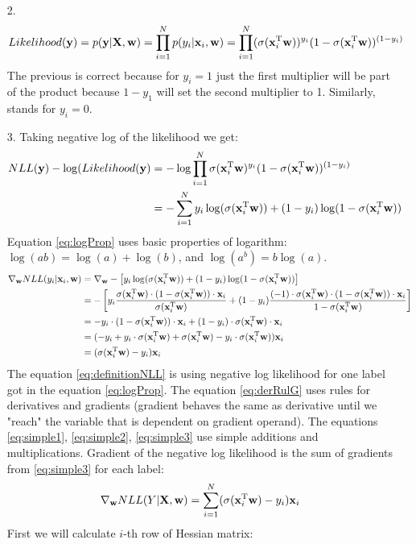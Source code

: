 \documentclass[10pt,a4paper]{article}
\begin{document}
\begin{enumerate}
\begin{enumerate}
\item[2.]
\begin{align*}
	Likelihood(\vect{y}) = p(\vect{y} | \mat{X}, \vect{w}) = \prod_{i=1}^Np(y_i|\vect{x}_i, \vect{w}) = 
	\prod_{i=1}^N (\logfun)^{y_i}(
	1 - \logfun)^{(1-y_i)}
\end{align*}
The previous is correct because for $y_i = 1$ just the first multiplier will be part of the product because $1-y_1$ will set the second multiplier to 1. Similarly, stands for $y_i = 0$.
\item[3.]
Taking negative log of the likelihood we get:
\begin{align}
NLL(\vect{y})-\log(Likelihood(\vect{y}) &= -\log \prod_{i=1}^N \sigma(\transpose{\vect{x}_i}\vect{w})^{y_i}(
	1 - \sigma(\transpose{\vect{x}}_i\vect{w}))^{(1-y_i)} \nonumber \\
	&= -\sum_{i=1}^Ny_i\log (\logfun) + (1-y_i)\log(1-\logfun) \label{eq:logProp}
\end{align}
Equation \ref{eq:logProp} uses basic properties of logarithm: $\log(ab) =\log(a) + \log(b)$, and $\log(a^b) = b\log(a)$.
\begin{align}
	\gradient{w}NLL(y_i|\vect{x}_i, \vect{w})
	&=\gradient{w}-\left[y_i\log (\logfun) + (1-y_i)\log(1-\logfun)\right] \label{eq:definitionNLL}\\
	&=-\left[y_i\frac {\logfun\cdot(1-\logfun)\cdot \vect{x}_i}{\logfun}
	 + (1-y_i)\frac{(-1)\cdot\logfun \cdot (1-\logfun)\cdot \vect{x}_i}{1-\logfun}\right] \label{eq:derRulG}\\
	 &= -y_i\cdot (1-\logfun)\cdot \vect{x}_i + (1-y_i)\cdot \logfun \cdot \vect{x}_i  \label{eq:simple1}\\
	 &= (-y_i +y_i \cdot \logfun + \logfun - y_i \cdot \logfun )\vect{x}_i  \label{eq:simple2} \\
	 &= (\logfun - y_i)\vect{x}_i  \label{eq:simple3}
\end{align}
The equation \ref{eq:definitionNLL} is using negative log likelihood for one label got in the equation \ref{eq:logProp}. The equation \ref{eq:derRulG} uses rules for derivatives and gradients (gradient behaves the same as derivative until we "reach" the variable that is dependent on gradient operand). The equations \ref{eq:simple1}, \ref{eq:simple2}, \ref{eq:simple3} use simple additions and multiplications.
Gradient of the negative log likelihood is the sum of gradients from \ref{eq:simple3} for each label:
$$\gradient{w}NLL(Y|\mat{X}, \vect{w})= \sum_{i=1}^N (\logfun - y_i)\vect{x}_i  $$
First we will calculate $i$-th row of Hessian matrix:

\end{enumerate}
\end{enumerate}
\end{document}
